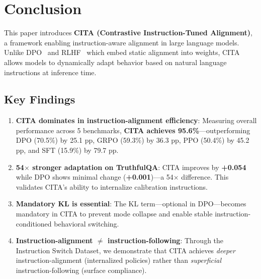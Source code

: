 
\vspace{-2mm}
\section{Conclusion}
\label{sec:conclusion}

This paper introduces \textbf{CITA (Contrastive Instruction-Tuned Alignment)}, a framework enabling instruction-aware alignment in large language models. Unlike DPO~\cite{rafailov2023direct} and RLHF~\cite{ouyang2022training} which embed static alignment into weights, CITA allows models to dynamically adapt behavior based on natural language instructions at inference time.

\vspace{-2mm}
\subsection{Key Findings}
\label{sec:key_findings}

\begin{enumerate}[leftmargin=*,itemsep=2pt]
    \item \textbf{CITA dominates in instruction-alignment efficiency}: Measuring overall performance across 5 benchmarks, \textbf{CITA achieves \colorbox{bg-green}{95.6\%}}---outperforming DPO (70.5\%) by 25.1 pp, GRPO (59.3\%) by 36.3 pp, PPO (50.4\%) by 45.2 pp, and SFT (15.9\%) by 79.7 pp.

    \item \textbf{54$\times$ stronger adaptation on TruthfulQA}: CITA improves by \textbf{+0.054} while DPO shows minimal change (\textbf{+0.001})---a 54$\times$ difference. This validates CITA's ability to internalize calibration instructions.

    \item \textbf{Mandatory KL is essential}: The KL term---optional in DPO---becomes mandatory in CITA to prevent mode collapse and enable stable instruction-conditioned behavioral switching.

    \item \textbf{Instruction-alignment $\neq$ instruction-following}: Through the Instruction Switch Dataset, we demonstrate that CITA achieves \textit{deeper} instruction-alignment (internalized policies) rather than \textit{superficial} instruction-following (surface compliance).
\end{enumerate}

